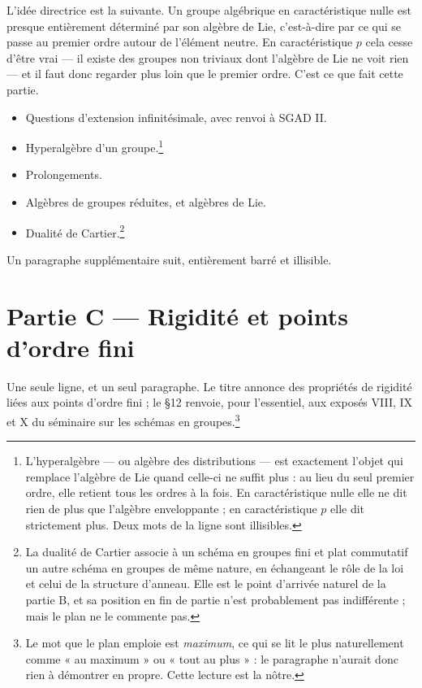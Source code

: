 \documentclass[11pt,a4paper]{article}
\begin{document}
L'idée directrice est la suivante. Un groupe algébrique en caractéristique
nulle est presque entièrement déterminé par son algèbre de Lie, c'est-à-dire
par ce qui se passe au premier ordre autour de l'élément neutre. En
caractéristique $p$ cela cesse d'être vrai --- il existe des groupes non
triviaux dont l'algèbre de Lie ne voit rien --- et il faut donc regarder plus
loin que le premier ordre. C'est ce que fait cette partie.

\begin{itemize}
\item[§7] Questions d'extension infinitésimale, avec renvoi à SGAD II.
\item[§8] Hyperalgèbre d'un groupe.\footnote{L'hyperalgèbre --- ou algèbre des
distributions --- est exactement l'objet qui remplace l'algèbre de Lie quand
celle-ci ne suffit plus : au lieu du seul premier ordre, elle retient tous les
ordres à la fois. En caractéristique nulle elle ne dit rien de plus que
l'algèbre enveloppante ; en caractéristique $p$ elle dit strictement plus. Deux
mots de la ligne sont illisibles.}
\item[§9] Prolongements.
\item[§10] Algèbres de groupes réduites, et algèbres de Lie.
\item[§11] Dualité de Cartier.\footnote{La dualité de Cartier associe à un
schéma en groupes fini et plat commutatif un autre schéma en groupes de même
nature, en échangeant le rôle de la loi et celui de la structure d'anneau. Elle
est le point d'arrivée naturel de la partie B, et sa position en fin de partie
n'est probablement pas indifférente ; mais le plan ne le commente pas.}
\end{itemize}

Un paragraphe supplémentaire suit, entièrement barré et illisible.

\section*{Partie C --- Rigidité et points d'ordre fini}

Une seule ligne, et un seul paragraphe. Le titre annonce des propriétés de
rigidité liées aux points d'ordre fini ; le §12 renvoie, pour l'essentiel, aux
exposés VIII, IX et X du séminaire sur les schémas en groupes.\footnote{Le mot
que le plan emploie est \emph{maximum}, ce qui se lit le plus naturellement
comme « au maximum » ou « tout au plus » : le paragraphe n'aurait donc rien à
démontrer en propre. Cette lecture est la nôtre.}
\end{document}
